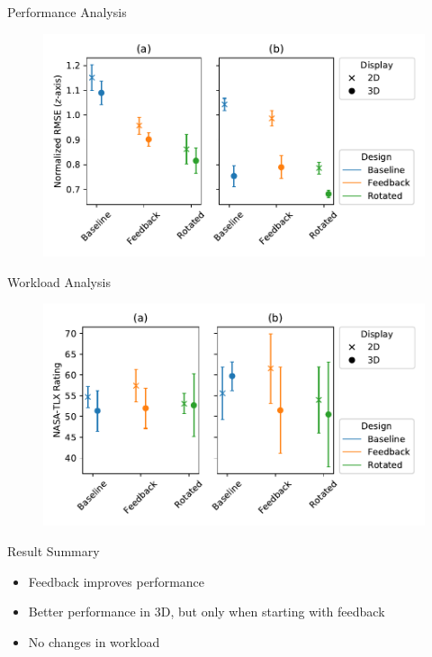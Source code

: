 \documentclass[10pt]{beamer}
\begin{document}
\begin{frame}[fragile]{Performance Analysis}
\begin{figure}
  \begin{center}
    \includegraphics[width=\linewidth]{../img/2way.pdf}
  \end{center}
\end{figure}
\end{frame}

\begin{frame}[fragile]{Workload Analysis}
\begin{figure}
  \begin{center}
    \includegraphics[width=\linewidth]{../img/2way-work.pdf}
  \end{center}
\end{figure}
\end{frame}

\begin{frame}[fragile]{Result Summary}
  \begin{itemize}
    \setlength\itemsep{1em}
    \item Feedback improves performance
    \item Better performance in 3D, but only when starting with feedback
    \item No changes in workload
  \end{itemize}
\end{frame}
\end{document}
